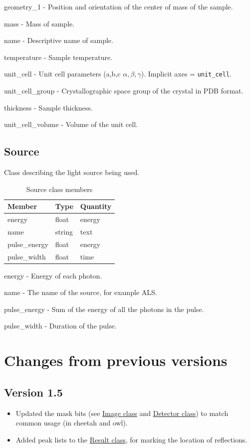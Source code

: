 \documentclass[usletter,11pt]{article}
\newcommand{\member}[2]
{ \noindent
{ \color{softBlue}  #1 - } #2
\vspace{0.2cm}
}
\begin{document}
\member{geometry\_1}{Position and orientation of the center of mass of the sample.}

\member{mass}{Mass of sample.}

\member{name}{Descriptive name of sample.}

\member{temperature}{Sample temperature.}

\member{unit\_cell}{Unit cell parameters (a,b,c
  $\alpha,\beta,\gamma$). Implicit axes = {\tt unit\_cell}.}

\member{unit\_cell\_group}{Crystallographic space group of the crystal
  in PDB format.}

\member{thickness}{Sample thickness.}

\member{unit\_cell\_volume}{Volume of the unit cell.}


\subsection{Source}
\label{table:source}

Class describing the light source being used.

\begin{table}[h!]\sffamily \footnotesize
\caption{Source class members}

\begin{tabular}{p{4.5cm} p{4.5cm}  p{2.5cm} }
\toprule
\bfseries Member     & \bfseries Type & \bfseries Quantity \\
\midrule
energy     & float & energy  \\
name     & string & text  \\
pulse\_energy  & float & energy  \\
pulse\_width  & float & time  \\
\bottomrule
\end{tabular}
\end{table}

\member{energy}{Energy of each photon.}

\member{name}{The name of the source, for example ALS.}

\member{pulse\_energy}{Sum of the energy of all the photons in the pulse.}

\member{pulse\_width}{Duration of the pulse.}

\clearpage
\section{Changes from previous versions}
\subsection{Version 1.5}
\begin{itemize}
\item{Updated the mask bits (see \hyperref[table:image]{Image
    class} and \hyperref[table:detector]{Detector class}) to match common usage
  (in cheetah and owl). }
\item{Added peak lists to the \hyperref[table:result]{Result
    class}, for marking the location of reflections.}
\end{itemize}
\end{document}
